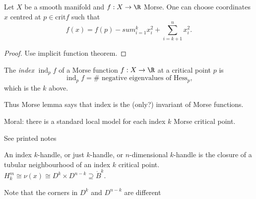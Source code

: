 \documentclass[a4paper]{article}
\newcommand{\interior}{\ocirc}
\begin{document}
\begin{lemma}
  Let \(X\) be a smooth manifold and \(f: X \to \R\) Morse. One can choose coordinates \(x\) centred at \(p \in \textrm{crit} f\) such that
  \[
    f(x) = f(p) - sum_{i = 1}^k x_i^2 + \sum_{i = k + 1}^n x_i^2.
  \]
\end{lemma}

\begin{proof}
  Use implicit function theorem.
\end{proof}

\begin{definition}[index]
  The \emph{index} \(\operatorname{ind}_p f\) of a Morse function \(f: X \to \R\) at a critical point \(p\) is
  \[
    \operatorname{ind}_p f = \# \text{ negative eigenvalues of } \textrm{Hess}_p,
  \]
  which is the \(k\) above.
\end{definition}

Thus Morse lemma says that index is the (only?) invariant of Morse functions.

Moral: there is a standard local model for each index \(k\) Morse critical point.

See printed notes

\begin{definition}[\(k\)-handle]
  An index \(k\)-handle, or just \(k\)-handle, or \(n\)-dimensional \(k\)-handle is the closure of a tubular neighbourhood of an index \(k\) critical point.
  \(H_k^m \cong \nu(x) \cong D^k \times D^{n - k} \supseteq \interior B^k\).
\end{definition}

Note that the corners in \(D^k\) and \(D^{n - k}\) are different














\printindex
\end{document}
